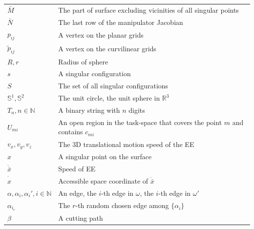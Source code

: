 \documentclass[Afour,sageh,times]{sagej}
\begin{document}
\begin{table}[h]
\begin{tabular}{>{\bfseries}ll}
$\bar{M}$ & The part of surface excluding vicinities of all singular points\\
$\bar{N}$ & The last row of the manipulator Jacobian\\
$p_{ij}$ & A vertex on the planar grids\\
$\tilde{p}_{ij}$ & A vertex on the curvilinear grids\\
$R, r$ & Radius of sphere\\
$s$ & A singular configuration\\
$S$ & The set of all singular configurations\\
$\mathbb{S}^1, \mathbb{S}^2$ & The unit circle, the unit sphere in $\mathbb{R}^{3}$\\
$T_n, n\in \mathbb{N}$ & A binary string with $n$ digits\\
$U_{mi}$ & An open region in the task-space that covers the point $m$ and contains $c_{mi}$\\
$v_x, v_y, v_z$ & The 3D translational motion speed of the EE\\
$x$ & A singular point on the surface\\
$\dot{\bar{x}}$ & Speed of EE\\
$\dot{\hat{x}}$ & Accessible space coordinate of $\dot{\bar{x}}$\\
$\alpha, \alpha_i, \alpha_i', i\in \mathbb{N}$ & An edge, the $i$-th edge in $\omega$, the $i$-th edge in $\omega'$\\
$\alpha_{i_r}$ & The $r$-th random chosen edge among $\{\alpha_i\}$\\
$\beta$ & A cutting path\\

\end{tabular}
\end{table}
\end{document}
